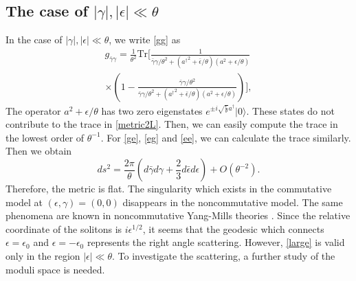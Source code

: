 \documentclass[a4paper,12pt]{article}
\begin{document}
\subsection{The case of $|\gamma|,|\epsilon| \ll \theta$}
In the case of $|\gamma|,|\epsilon| \ll \theta$, we write \eqref{gg} as
\begin{multline}
g_{\bar{\gamma}\gamma}=\frac{1}{\theta^2}\mbox{Tr}\Biggl[\frac{1}{\bar{\gamma}\gamma/\theta^2+({a^\dag}^2+
\bar{\epsilon}/\theta)(a^2+\epsilon/\theta)}\\ \times\left(1-\frac{\bar{\gamma}\gamma/\theta^2}{\bar{\gamma}\gamma/\theta^2
+({a^\dag}^2+\bar{\epsilon}/\theta)(a^2+\epsilon/\theta)}\right)\Biggr], \label{metric2L}
\end{multline}
The operator $a^2+\epsilon/\theta$ has two zero eigenstates 
$e^{\pm i\sqrt{\frac{\epsilon}{\theta}}a^\dag}|0\rangle$. These states do not contribute to the
trace in \eqref{metric2L}. Then, we can easily compute the trace in the lowest order of 
$\theta^{-1}$. For \eqref{ge}, \eqref{eg} and \eqref{ee}, we can calculate the trace similarly.
Then we obtain
\begin{equation}
ds^2=\frac{2\pi}{\theta}\left(d\bar{\gamma}d\gamma+\frac{2}{3}d\bar{\epsilon}d\epsilon\right)+O(\theta^{-2})\label{large}.
\end{equation}
Therefore, the metric is flat. 
The singularity which exists in the commutative model at 
$(\epsilon, \gamma)=(0,0)$ disappears in the noncommutative 
model. The same phenomena are known in noncommutative 
Yang-Mills theories \cite{LTY,Nak}.
Since the relative coordinate of the solitons is $i\epsilon^{1/2}$, 
it seems that the geodesic which connects $\epsilon=\epsilon_0$ 
and $\epsilon=-\epsilon_0$ represents the right angle scattering. 
However, \eqref{large} is valid only in the region $|\epsilon| \ll \theta$. 
To investigate the scattering, a further study of the moduli space is
needed.
\end{document}
